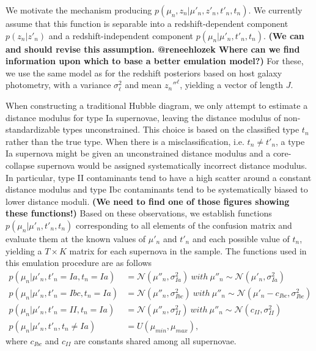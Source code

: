 \documentclass[12pt, onecolumn]{emulateapj}
\begin{document}
We motivate the mechanism producing $p(\mu_{n}, z_{n} | \mu'_{n}, z'_{n}, t'_{n}, t_{n})$.  We currently assume that this function is separable into a redshift-dependent component $p(z_{n} | z'_{n})$ and a redshift-independent component $p(\mu_{n} | \mu'_{n}, t'_{n}, t_{n})$.  \textbf{(We can and should revise this assumption.  @reneehlozek Where can we find information upon which to base a better emulation model?)}  For these, we use the same model as for the redshift posteriors based on host galaxy photometry, with a variance $\sigma_{\ell}^{2}$ and mean $z_{n}''^{\ell}$, yielding a vector of length $J$.

When constructing a traditional Hubble diagram, we only attempt to estimate a distance modulus for type Ia supernovae, leaving the distance modulus of non-standardizable types unconstrained.  This choice is based on the classified type $t_{n}$ rather than the true type.  When there is a misclassification, i.e. $t_{n}\neq t'_{n}$, a type Ia supernova might be given an unconstrained distance modulus and a core-collapse supernova would be assigned systematically incorrect distance modulus.  In particular, type II contaminants tend to have a high scatter around a constant distance modulus and type Ibc contaminants tend to be systematically biased to lower distance moduli.  \textbf{(We need to find one of those figures showing these functions!)}  Based on these observations, we establish functions $p(\mu_{n} | \mu'_{n}, t'_{n}, t_{n})$ corresponding to all elements of the confusion matrix and evaluate them at the known values of $\mu'_{n}$ and $t'_{n}$ and each possible value of $t_{n}$, yielding a $T\times K$ matrix for each supernova in the sample.  The functions used in this emulation procedure are as follows
\begin{align}
\label{eq:emulation}
p(\mu_{n} | \mu'_{n}, t'_{n}=Ia, t_{n}=Ia) &= \mathcal{N}(\mu''_{n}, \sigma_{Ia}^{2})\ with\ \mu''_{n}\sim\mathcal{N}(\mu'_{n}, \sigma_{Ia}^{2})\\
p(\mu_{n} | \mu'_{n}, t'_{n}=Ibc, t_{n}=Ia) &= \mathcal{N}(\mu''_{n}, \sigma_{Ibc}^{2})\ with\ \mu''_{n}\sim\mathcal{N}(\mu'_{n} - c_{Ibc}, \sigma_{Ibc}^{2})\\
p(\mu_{n} | \mu'_{n}, t'_{n}=II, t_{n}=Ia) &= \mathcal{N}(\mu''_{n}, \sigma_{II}^{2})\ with\ \mu''_{n}\sim\mathcal{N}(c_{II}, \sigma_{II}^{2})\\
p(\mu_{n} | \mu'_{n}, t'_{n}, t_{n}\neq Ia) &= U(\mu_{min}, \mu_{max}),
\end{align}
where $c_{Ibc}$ and $c_{II}$ are constants shared among all supernovae.
\end{document}
